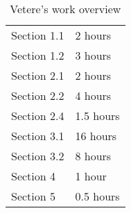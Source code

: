\begin{table} [H]
\centering
{}
{\centering
\begin{tabular}{m{2.5in}|m{.9in}}
Section 1.1 & 2 hours\\
Section 1.2 & 3 hours\\
Section 2.1 & 2 hours\\
Section 2.2 & 4 hours\\
Section 2.4 & 1.5 hours\\
Section 3.1 & 16 hours\\
Section 3.2 & 8 hours\\
Section 4 & 1 hour\\
Section 5 & 0.5 hours\\
\end{tabular}
}
\caption{Vetere's work overview}
\end{table}

